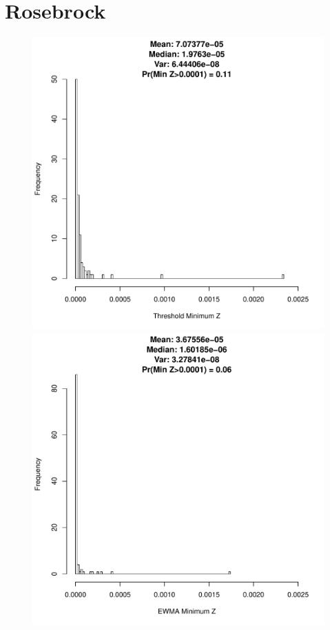 \documentclass{article}
\begin{document}
%
%
%

%
\section{Rosebrock}
%
\begin{figure}[h!]
        \begin{center}
                \begin{minipage}[h!]{0.32\textwidth}
                        \includegraphics[width=1.0\textwidth]{threshSimHist.pdf}
                \end{minipage}
                \begin{minipage}[h!]{0.32\textwidth}
                        \includegraphics[width=1.0\textwidth]{ewmaSimHist.pdf}

\end{minipage}
\end{center}
\end{figure}
\end{document}

